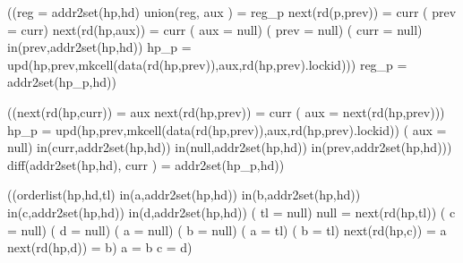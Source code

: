 	\begin{axiomdescription}
		\label{ax::insert__keeps_addr2set}
		\begin{formula}
			((reg = addr2set(hp,hd) \wedge union(reg,{ aux }) = reg_p \wedge next(rd(p,prev)) = curr \wedge (\neg\;  prev = curr) \wedge next(rd(hp,aux)) = curr \wedge (\neg\;  aux = null) \wedge (\neg\;  prev = null) \wedge (\neg\;  curr = null) \wedge in(prev,addr2set(hp,hd)) \wedge hp_p = upd(hp,prev,mkcell(data(rd(hp,prev)),aux,rd(hp,prev).lockid))) \implies reg_p = addr2set(hp_p,hd))
		\end{formula}
	\end{axiomdescription}

	\begin{axiomdescription}
		\label{ax::remove__keeps_addr2set}
		\explanation{
			\paragraph{Interpretation:}
		}
		\begin{formula}
			((next(rd(hp,curr)) = aux \wedge next(rd(hp,prev)) = curr \wedge (\neg\;  aux = next(rd(hp,prev))) \wedge hp_p = upd(hp,prev,mkcell(data(rd(hp,prev)),aux,rd(hp,prev).lockid)) \wedge (\neg\;  aux = null) \wedge in(curr,addr2set(hp,hd)) \wedge in(null,addr2set(hp,hd)) \wedge in(prev,addr2set(hp,hd))) \implies diff(addr2set(hp,hd),{ curr }) = addr2set(hp_p,hd))
		\end{formula}
	\end{axiomdescription}

	\begin{axiomdescription}
		\label{ax::next_injective__if_ordered}
		\begin{formula}
			((orderlist(hp,hd,tl) \wedge in(a,addr2set(hp,hd)) \wedge in(b,addr2set(hp,hd)) \wedge in(c,addr2set(hp,hd)) \wedge in(d,addr2set(hp,hd)) \wedge (\neg\;  tl = null) \wedge null = next(rd(hp,tl)) \wedge (\neg\;  c = null) \wedge (\neg\;  d = null) \wedge (\neg\;  a = null) \wedge (\neg\;  b = null) \wedge (\neg\;  a = tl) \wedge (\neg\;  b = tl) \wedge next(rd(hp,c)) = a \wedge next(rd(hp,d)) = b) \implies a = b \implies c = d)
		\end{formula}
	\end{axiomdescription}

